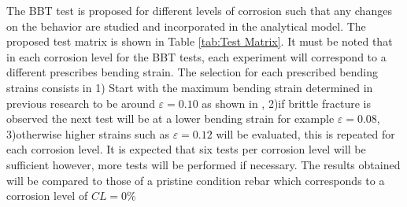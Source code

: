 The BBT test is proposed for different levels of corrosion such that any changes on the behavior are studied and incorporated in the analytical model. The proposed test matrix is shown in Table \ref{tab:Test Matrix}. It must be noted that in each corrosion level for the BBT tests, each experiment will correspond to a different prescribes bending strain. The selection for each prescribed bending strains consists in 1) Start with the maximum bending strain determined in previous research to be around $\varepsilon=0.10$ as shown in , 2)if brittle fracture is observed the next test will be at a lower bending strain for example $\varepsilon=0.08$, 3)otherwise higher strains such as $\varepsilon=0.12$ will be evaluated, this is repeated for each corrosion level. It is expected that six tests per corrosion level will be sufficient however, more tests will be performed if necessary. The results obtained will be compared to those of a pristine condition rebar which corresponds to a corrosion level of $CL=0\%$

